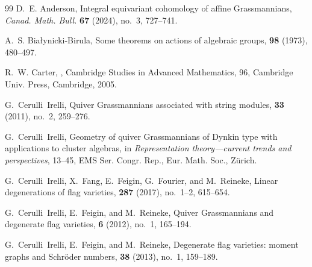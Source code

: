 \documentclass[10pt, a4paper, reqno]{amsart}
\begin{document}




	
\begin{thebibliography}{99}
	 D.~E. Anderson, Integral equivariant cohomology of affine Grassmannians, {\em Canad. Math. Bull.} {\bf 67} (2024), no.~3, 727--741.
	
	A.~S. Bia\l ynicki-Birula,
	\newblock Some theorems on actions of algebraic groups,
	 {\bf 98} (1973), 480--497.
	
	R.~W. Carter,
	,
	\newblock Cambridge Studies in Advanced Mathematics, 96, Cambridge Univ. Press, Cambridge, 2005.
	
	G.~Cerulli~Irelli,
	\newblock Quiver Grassmannians associated with string modules,
	 {\bf 33} (2011), no.~2, 259--276.
	
	G.~Cerulli~Irelli,
	\newblock Geometry of quiver Grassmannians of Dynkin type with applications to cluster algebras,
	\newblock in {\em Representation theory---current trends and perspectives}, 13--45,
	EMS Ser. Congr. Rep., Eur. Math. Soc., Zürich.
	
	G.~Cerulli~Irelli, X.~Fang, E.~Feigin, G.~Fourier, and M.~Reineke,
	\newblock Linear degenerations of flag varieties,
	 {\bf 287} (2017), no.~1--2, 615--654.
	
	G.~Cerulli~Irelli, E.~Feigin, and M.~Reineke,
	\newblock Quiver Grassmannians and degenerate flag varieties,
	 {\bf 6} (2012), no.~1, 165--194.
	
	G.~Cerulli~Irelli, E.~Feigin, and M.~Reineke,
	\newblock Degenerate flag varieties: moment graphs and Schr\"oder numbers,
	 {\bf 38} (2013), no.~1, 159--189.
	

\end{thebibliography}
\end{document}
